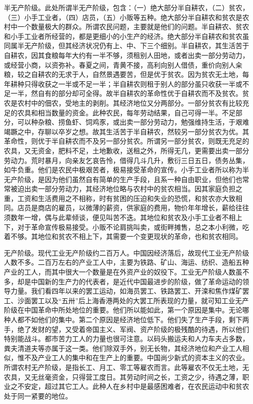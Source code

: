 半无产阶级。此处所谓半无产阶级，包含：（一）绝大部分半自耕农，（二）贫农，（三）小手工业者，（四）店员，（五）小贩等五种。绝大部分半自耕农和贫农是农村中一个数量极大的群众。所谓农民问题，主要就是他们的问题。半自耕农、贫农和小手工业者所经营的，都是更细小的小生产的经济。绝大部分半自耕农和贫农虽同属半无产阶级，但其经济状况仍有上、中、下三个细别。半自耕农，其生活苦于自耕农，因其食粮每年大约有一半不够，须租别人田地，或者出卖一部分劳动力，或经营小商，以资弥补。春夏之间，青黄不接，高利向别人借债，重价向别人籴粮，较之自耕农的无求于人，自然景遇要苦，但是优于贫农。因为贫农无土地，每年耕种只得收获之一半或不足一半；半自耕农则租于别人的部分虽只收获一半或不足一半，然自有的部分却可全得。故半自耕农的革命性优于自耕农而不及贫农。贫农是农村中的佃农，受地主的剥削。其经济地位又分两部分。一部分贫农有比较充足的农具和相当数量的资金。此种农民，每年劳动结果，自己可得一半。不足部分，可以种杂粮、捞鱼虾、饲鸡豕，或出卖一部分劳动力，勉强维持生活，于艰难竭蹶之中，存聊以卒岁之想。故其生活苦于半自耕农，然较另一部分贫农为优。其革命性，则优于半自耕农而不及另一部分贫农。所谓另一部分贫农，则既无充足的农具，又无资金，肥料不足，土地歉收，送租之外，所得无几，更需要出卖一部分劳动力。荒时暴月，向亲友乞哀告怜，借得几斗几升，敷衍三日五日，债务丛集，如牛负重。他们是农民中极艰苦者，极易接受革命的宣传。小手工业者所以称为半无产阶级，是因为他们虽然自有简单的生产手段，且系一种自由职业，但他们也常常被迫出卖一部分劳动力，其经济地位略与农村中的贫农相当。因其家庭负担之重，工资和生活费用之不相称，时有贫困的压迫和失业的恐慌，和贫农亦大致相同。店员是商店的雇员，以微薄的薪资，供家庭的费用，物价年年增长，薪给往往须数年一增，偶与此辈倾谈，便见叫苦不迭。其地位和贫农及小手工业者不相上下，对于革命宣传极易接受。小贩不论肩挑叫卖，或街畔摊售，总之本小利微，吃着不够。其地位和贫农不相上下，其需要一个变更现状的革命，也和贫农相同。

无产阶级。现代工业无产阶级约二百万人。中国因经济落后，故现代工业无产阶级人数不多。二百万左右的产业工人中，主要为铁路、矿山、海运、纺织、造船五种产业的工人，而其中很大一个数量是在外资产业的奴役下。工业无产阶级人数虽不多，却是中国新的生产力的代表者，是近代中国最进步的阶级，做了革命运动的领导力量。我们看四年以来的罢工运动，如海员罢工、铁路罢工、开滦和焦作煤矿罢工、沙面罢工以及“五卅”后上海香港两处的大罢工所表现的力量，就可知工业无产阶级在中国革命中所处地位的重要。他们所以能如此，第一个原因是集中。无论哪种人都不如他们的集中。第二个原因是经济地位低下。他们失了生产手段，剩下两手，绝了发财的望，又受着帝国主义、军阀、资产阶级的极残酷的待遇，所以他们特别能战斗。都市苦力工人的力量也很可注意。以码头搬运夫和人力车夫占多数，粪夫清道夫等亦属于这一类。他们除双手外，别无长物，其经济地位和产业工人相似，惟不及产业工人的集中和在生产上的重要。中国尚少新式的资本主义的农业。所谓农村无产阶级，是指长工、月工、零工等雇农而言。此等雇农不仅无土地，无农具，又无丝毫资金，只得营工度日。其劳动时间之长，工资之少，待遇之薄，职业之不安定，超过其它工人。此种人在乡村中是最感困难者，在农民运动中和贫农处于同一紧要的地位。

